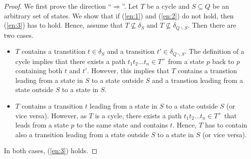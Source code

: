 \documentclass[a4paper,UKenglish,cleveref,autoref,thm-restate]{lipics-v2021}
\begin{document}
\begin{proof}
  We first prove the direction ``$\Longrightarrow$''. Let $T$ be a
  cycle and $S\subseteq Q$ be an arbitrary set of states. We show that
  if (\ref{en:1}) and (\ref{en:2}) do not hold, then (\ref{en:3}) has
  to hold. Hence, assume that $T\not\subseteq\delta_S$ and
  $T\not\subseteq\delta_{Q\smallsetminus S}$. Then there are two
  cases.
  \begin{itemize}
  \item $T$ contains a transtition $t\in\delta_S$ and a transition
    $t'\in\delta_{Q\smallsetminus S}$. The definition of a cycle
    implies that there exists a path $t_1t_2\ldots t_n\in T^+$ from a
    state $p$ back to $p$ containing both $t$ and $t'$. However, this
    implies that $T$ contains a transtion leading from a state in $S$
    to a state outside $S$ and a transtion leading from a state outside $S$
    to a state in $S$.
  \item $T$ contains a transition $t$ leading from a state in $S$ to a
    state outside $S$ (or vice versa). However, as $T$ is a cycle,
    there exists a path $t_1t_2\ldots t_n\in T^+$ that leads from a
    state $p$ to the same state and contains $t$. Hence, $T$ has to
    contain also a transition leading from a state outside $S$ to a
    state in $S$ (or vice versa).
  \end{itemize}
  In both cases, (\ref{en:3}) holds.


\end{proof}
\end{document}

